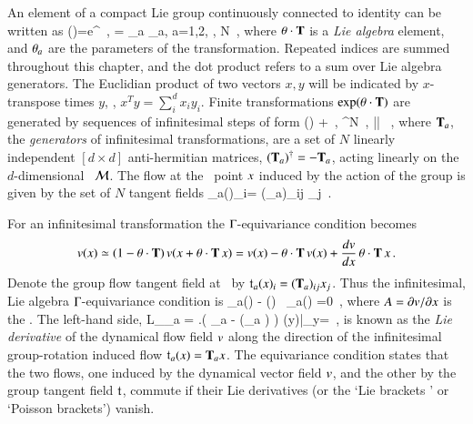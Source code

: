 An element of a compact Lie group
continuously connected to identity can be written as
\beq
\LieEl(\gSpace)=e^{\gSpace \cdot \Lg }
	\,,\qquad
\gSpace \cdot \Lg  = \sum \gSpace_a \Lg_a,\; a=1,2, \cdots, N
\,,
where
$\gSpace \cdot \Lg$
is a {\em Lie algebra} element,  and $\gSpace_a$ are the parameters
of the transformation. Repeated indices are summed throughout this
chapter, and the dot product refers to a sum over
Lie algebra generators. The Euclidian product of two vectors
$x,y$ will be indicated by $x$-transpose times $y$, \ie,
$x^T y = \sum_i^d x_i y_i$.
Finite transformations $ \exp(\gSpace \cdot {\Lg}) $ are
generated by sequences of infinitesimal steps of form
\beq
\LieEl(\delta\gSpace)  + \delta \gSpace \cdot \Lg
    \,,\quad
\delta\gSpace \in \reals^N
    \,,\quad
|\delta \gSpace| 
    \, ,
where $\Lg_a$, the {\em generators} of infinitesimal
transformations, are a set of $N$ linearly independent
$[d\!\times\!d]$ anti-hermitian matrices, $(\Lg_a)^\dagger =
- \Lg_a$, acting linearly on the $d$-dim\-ens\-ion\-al \statesp\
$\pS$.
The flow
at the \statesp\ point $\ssp$ induced by the action of the group
is given by the set of $N$ tangent fields
\beq
\groupTan_a(\ssp)_{i}= (\Lg_a){}_{ij} \ssp_j
\,.



%
For an infinitesimal transformation 
the $\Group$-equivariance condition 
becomes
\[
\vel(\ssp)
      \simeq
  (1-\gSpace \cdot \Lg) \, \vel(\ssp+\gSpace \cdot \Lg \, \ssp)
       = \vel(\ssp)- \gSpace \cdot \Lg \, \vel(\ssp)
             + \frac{d\vel}{d\ssp} \,\gSpace \cdot \Lg \, \ssp
\,.
\]
Denote
the group flow tangent field at \ssp\ by
$\mathfrak{t}_a(x)_{i}= (\mathbf{T}_a){}_{ij} x_j$. Thus the
infinitesimal, Lie algebra $\Gamma$-equivariance condition is
\beq
  \groupTan_a(\vel)  - \Mvar(\ssp) \, \groupTan_a(\ssp) =0
  \,,
where $A = {\partial v}/{\partial x}$ is the \stabmat.
The left-hand side,
\beq
{\cal L}_{\groupTan_a} \vel =
\left.\left(
  \Lg_a - (\Lg_a \ssp)
 \right) \vel(y)\right|_{y=\ssp}
 \,,
is known as
the {\em Lie derivative} of the dynamical flow
field $v$ along the direction of the infinitesimal
group-rotation induced flow $\mathfrak{t}_a(x)= \mathbf{T}_a x$.
The equivariance condition  states that the two
flows, one induced by the dynamical vector field $v$, and
the other by the group tangent field $\mathfrak{t}$, commute if
their Lie derivatives (or the `Lie brackets ' or `Poisson
brackets') vanish.


